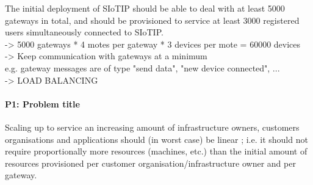     The initial deployment of SIoTIP should be able to deal with at least 5000
    gateways in total, and should be provisioned to service at least 3000
    registered users simultaneously connected to SIoTIP.\\
    -> 5000 gateways * 4 motes per gateway * 3 devices per mote = 60000 devices\\
    -> Keep communication with gateways at a minimum\\
       e.g. gateway messages are of type "send data", "new device connected", ...\\
    -> LOAD BALANCING

    \paragraph{P1: Problem title}
        Scaling up to service an increasing amount of infrastructure owners,
        customers organisations and applications should (in worst case) be linear ;
        i.e. it should not require proportionally more resources (machines, etc.)
        than the initial amount of resources provisioned per customer
        organisation/infrastructure owner and per gateway.


